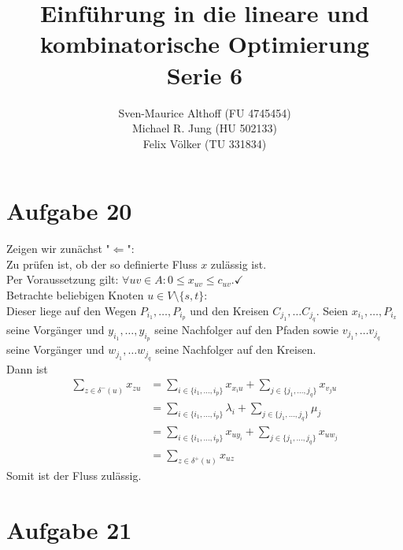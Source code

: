 \documentclass[a4paper,12pt,german]{scrartcl}
\title{Einführung in die lineare und kombinatorische Optimierung\\
Serie 6}
\author{Sven-Maurice Althoff (FU 4745454)\\Michael R. Jung (HU 502133)\\Felix Völker (TU 331834)}
\begin{document}
\maketitle

\section*{Aufgabe 20}
Zeigen wir zunächst "$\Leftarrow$":\\
Zu prüfen ist, ob der so definierte Fluss $x$ zulässig ist.\\
Per Voraussetzung gilt: $\forall uv\in A:0\leq x_{uv}\leq c_{uv}.\checkmark$\\
Betrachte beliebigen Knoten $u\in V\setminus \{s,t\}$:\\
Dieser liege auf den Wegen $P_{i_1},\dots,P_{i_p}$ und den Kreisen $C_{j_1},\dots C_{j_q}$.
Seien $x_{i_1},\dots,P_{i_x}$ seine Vorgänger und $y_{i_1},\dots,y_{i_p}$ seine Nachfolger auf den Pfaden sowie $v_{j_1},\dots v_{j_q}$ seine Vorgänger und $w_{j_1},\dots w_{j_q}$ seine Nachfolger auf den Kreisen.\\
Dann ist \begin{align*}
\sum\limits_{z\in\delta^-(u)}x_{zu}
&=\sum\limits_{i\in\{i_1,\dots,i_p\}}x_{x_iu}+ \sum\limits_{j\in\{j_1,\dots,j_q\}}x_{v_ju}\\
&=\sum\limits_{i\in\{i_1,\dots,i_p\}}\lambda_i+ \sum\limits_{j\in\{j_1,\dots,j_q\}}\mu_j\\
&=\sum\limits_{i\in\{i_1,\dots,i_p\}}x_{uy_i}+ \sum\limits_{j\in\{j_1,\dots,j_q\}}x_{uw_j}\\
&=\sum\limits_{z\in\delta^+(u)}x_{uz}
\end{align*}
Somit ist der Fluss zulässig.
\section*{Aufgabe 21}
\end{document}
